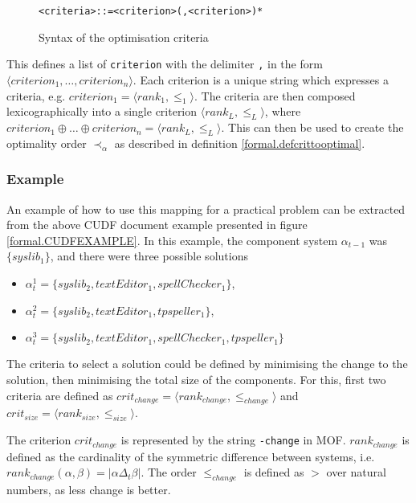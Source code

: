 \begin{figure}[h!]
\begin{center}
\begin{alltt}
<criteria> ::= <criterion> (, <criterion>)*
\end{alltt}
  \caption{Syntax of the optimisation criteria}
  \label{formal.optbnf}
\end{center}
\end{figure}
This defines a list of \verb+criterion+ with the delimiter \verb+,+ in the form $\langle criterion_1, \ldots, criterion_n \rangle$.
Each criterion is a unique string which expresses a criteria, e.g. $criterion_1 = \langle rank_1, \leq_1 \rangle$.
The criteria are then composed lexicographically into a single criterion $\langle rank_L, \leq_L \rangle$, 
where $criterion_1 \oplus \ldots \oplus criterion_n = \langle rank_L, \leq_L \rangle$. 
This can then be used to create the optimality order $\prec_{\alpha}$ as described in definition \ref{formal.defcrittooptimal}.

\subsubsection{Example}
An example of how to use this mapping for a practical problem can be extracted from the above CUDF document example presented in figure \ref{formal.CUDFEXAMPLE}.
In this example, the component system $\alpha_{t-1}$ was  $\{syslib_1\}$, and there were three possible solutions
\begin{itemize}
  \item $\alpha_t^1 = \{syslib_2, textEditor_1, spellChecker_1\}$,
  \item $\alpha_t^2 = \{syslib_2, textEditor_1, tpspeller_1\}$,
  \item $\alpha_t^3 = \{syslib_2, textEditor_1, spellChecker_1, tpspeller_1\}$
\end{itemize}

The criteria to select a solution could be defined by minimising the change to the solution, then minimising the total size of the components.
For this, first two criteria are defined as $crit_{change} = \langle rank_{change}, \leq_{change} \rangle$ and $crit_{size} = \langle rank_{size}, \leq_{size} \rangle$.

The criterion $crit_{change}$ is represented by the string \verb+-change+ in MOF.
$rank_{change}$ is defined as the cardinality of the symmetric difference between systems, i.e. $rank_{change}(\alpha,\beta) = |\alpha \Delta_t \beta|$.
The order $\leq_{change}$ is defined as $>$ over natural numbers, as less change is better. 

